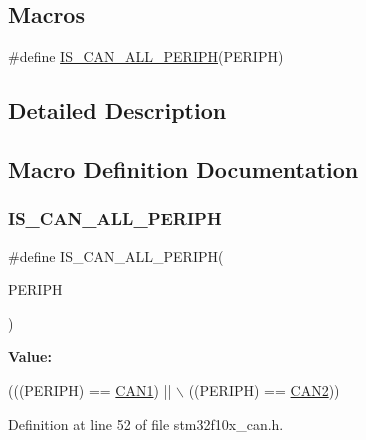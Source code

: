 \subsection*{Macros}
\begin{DoxyCompactItemize}
\item 
\#define \hyperlink{group___c_a_n___exported___types_gaf471a53f52a02078ffd842658d932f63}{I\+S\+\_\+\+C\+A\+N\+\_\+\+A\+L\+L\+\_\+\+P\+E\+R\+I\+PH}(P\+E\+R\+I\+PH)
\end{DoxyCompactItemize}


\subsection{Detailed Description}


\subsection{Macro Definition Documentation}
\mbox{\label{group___c_a_n___exported___types_gaf471a53f52a02078ffd842658d932f63}} 
\subsubsection{\texorpdfstring{I\+S\+\_\+\+C\+A\+N\+\_\+\+A\+L\+L\+\_\+\+P\+E\+R\+I\+PH}{IS\_CAN\_ALL\_PERIPH}}
{\footnotesize\ttfamily \#define I\+S\+\_\+\+C\+A\+N\+\_\+\+A\+L\+L\+\_\+\+P\+E\+R\+I\+PH(\begin{DoxyParamCaption}\item[{}]{P\+E\+R\+I\+PH }\end{DoxyParamCaption})}

{\bfseries Value\+:}
\begin{DoxyCode}
(((PERIPH) == \hyperlink{group___peripheral__declaration_ga4964ecb6a5c689aaf8ee2832b8093aac}{CAN1}) || \(\backslash\)
                                   ((PERIPH) == \hyperlink{group___peripheral__declaration_gac5e4c86ed487dc91418b156e24808033}{CAN2}))
\end{DoxyCode}


Definition at line 52 of file stm32f10x\+\_\+can.\+h.

